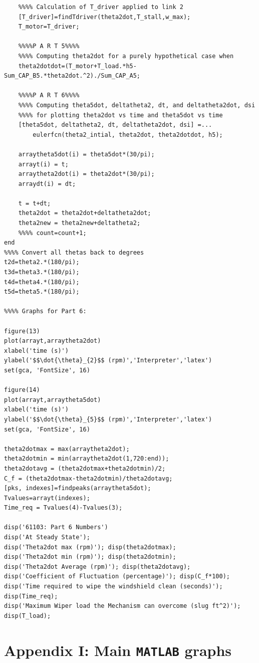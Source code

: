 \documentclass[12pt]{article}
\begin{document}
\begin{verbatim}
    %%%% Calculation of T_driver applied to link 2
    [T_driver]=findTdriver(theta2dot,T_stall,w_max);
    T_motor=T_driver;
   
    %%%%P A R T 5%%%%
    %%%% Computing theta2dot for a purely hypothetical case when
    theta2dotdot=(T_motor+T_load.*h5-Sum_CAP_B5.*theta2dot.^2)./Sum_CAP_A5;
    
    %%%%P A R T 6%%%%
    %%%% Computing theta5dot, deltatheta2, dt, and deltatheta2dot, dsi
    %%%% for plotting theta2dot vs time and theta5dot vs time
    [theta5dot, deltatheta2, dt, deltatheta2dot, dsi] =...
        eulerfcn(theta2_intial, theta2dot, theta2dotdot, h5);

    arraytheta5dot(i) = theta5dot*(30/pi);
    arrayt(i) = t;
    arraytheta2dot(i) = theta2dot*(30/pi);
    arraydt(i) = dt;
    
    t = t+dt;
    theta2dot = theta2dot+deltatheta2dot;
    theta2new = theta2new+deltatheta2;
    %%%% count=count+1;
end
%%%% Convert all thetas back to degrees
t2d=theta2.*(180/pi);
t3d=theta3.*(180/pi);
t4d=theta4.*(180/pi);
t5d=theta5.*(180/pi);

%%%% Graphs for Part 6:

figure(13)
plot(arrayt,arraytheta2dot)
xlabel('time (s)')
ylabel('$$\dot{\theta}_{2}$$ (rpm)','Interpreter','latex')
set(gca, 'FontSize', 16)
 
figure(14)
plot(arrayt,arraytheta5dot)
xlabel('time (s)')
ylabel('$$\dot{\theta}_{5}$$ (rpm)','Interpreter','latex')
set(gca, 'FontSize', 16)
 
theta2dotmax = max(arraytheta2dot);
theta2dotmin = min(arraytheta2dot(1,720:end));
theta2dotavg = (theta2dotmax+theta2dotmin)/2;
C_f = (theta2dotmax-theta2dotmin)/theta2dotavg;
[pks, indexes]=findpeaks(arraytheta5dot);
Tvalues=arrayt(indexes);
Time_req = Tvalues(4)-Tvalues(3);

disp('61103: Part 6 Numbers')
disp('At Steady State'); 
disp('Theta2dot max (rpm)'); disp(theta2dotmax); 
disp('Theta2dot min (rpm)'); disp(theta2dotmin); 
disp('Theta2dot Average (rpm)'); disp(theta2dotavg);
disp('Coefficient of Fluctuation (percentage)'); disp(C_f*100);
disp('Time required to wipe the windshield clean (seconds)'); disp(Time_req);
disp('Maximum Wiper load the Mechanism can overcome (slug ft^2)'); disp(T_load);
\end{verbatim}
\endgroup

\newpage
\section*{Appendix I: Main {\tt MATLAB} graphs}
\end{document}
